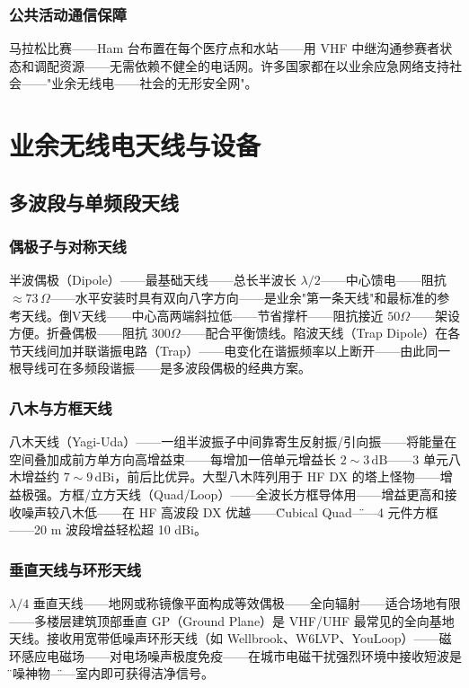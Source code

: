 \documentclass[12pt,UTF8]{ctexbook}
\begin{document}
\subsection{公共活动通信保障}
马拉松比赛——Ham 台布置在每个医疗点和水站——用 VHF 中继沟通参赛者状态和调配资源——无需依赖不健全的电话网。许多国家都在以业余应急网络支持社会——"业余无线电——社会的无形安全网"。


\chapter{业余无线电天线与设备}
\label{chap:ham_antenna_equipment}

\section{多波段与单频段天线}
\label{sec:ham_antennas}

\subsection{偶极子与对称天线}
半波偶极（Dipole）——最基础天线——总长半波长 $\lambda/2$——中心馈电——阻抗 $\approx73\,\Omega$——水平安装时具有双向八字方向——是业余"第一条天线"和最标准的参考天线。倒V天线——中心高两端斜拉低——节省撑杆——阻抗接近 $50\Omega$——架设方便。折叠偶极——阻抗 $300\Omega$——配合平衡馈线。陷波天线（Trap Dipole）在各节天线间加并联谐振电路（Trap）——电变化在谐振频率以上断开——由此同一根导线可在多频段谐振——是多波段偶极的经典方案。

\subsection{八木与方框天线}
八木天线（Yagi-Uda）——一组半波振子中间靠寄生反射振/引向振——将能量在空间叠加成前方单方向高增益束——每增加一倍单元增益长 $2\sim3\,\mathrm{dB}$——3 单元八木增益约 $7\sim9\,\mathrm{dBi}$，前后比优异。大型八木阵列用于 HF DX 的塔上怪物——增益极强。方框/立方天线（Quad/Loop）——全波长方框导体用——增益更高和接收噪声较八木低——在 HF 高波段 DX 优越——\"Cubical Quad\"——4 元件方框——20 m 波段增益轻松超 10 dBi。

\subsection{垂直天线与环形天线}
$\lambda/4$ 垂直天线——地网或称镜像平面构成等效偶极——全向辐射——适合场地有限——多楼层建筑顶部垂直 GP（Ground Plane）是 VHF/UHF 最常见的全向基地天线。接收用宽带低噪声环形天线（如 Wellbrook、W6LVP、YouLoop）——磁环感应电磁场——对电场噪声极度免疫——在城市电磁干扰强烈环境中接收短波是\"降噪神物\"——室内即可获得洁净信号。
\end{document}
